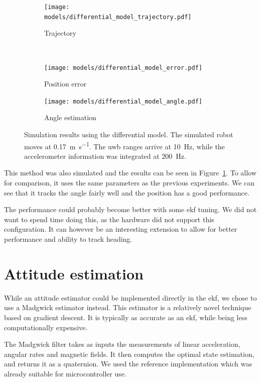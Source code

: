 \documentclass[a4paper, 12pt]{scrreprt}
\begin{document}
\begin{figure}[h!]
    \centering
    \begin{subfigure}[t]{0.4\textwidth}
        \texttt{[image: models/differential\_model\_trajectory.pdf]}
        \caption{Trajectory}
    \end{subfigure}%
    ~
    \begin{subfigure}[t]{0.4\textwidth}
        \texttt{[image: models/differential\_model\_error.pdf]}
        \caption{Position error}
    \end{subfigure}

    \begin{subfigure}[t]{0.4\textwidth}
        \texttt{[image: models/differential\_model\_angle.pdf]}
        \caption{Angle estimation}
    \end{subfigure}

    \caption{Simulation results using the differential model.
        The simulated robot moves at \SI{0.17}{\meter\per\second}.
        The \gls{uwb} ranges arrive at \SI{10}{\hertz}, while the accelerometer information was integrated at \SI{200}{\hertz}.
        \label{fig:differential_model}
    }
\end{figure}

This method was also simulated and the results can be seen in Figure~\ref{fig:differential_model}.
To allow for comparison, it uses the same parameters as the previous experiments.
We can see that it tracks the angle fairly well and the position has a good performance.

The performance could probably become better with some \gls{ekf} tuning.
We did not want to spend time doing this, as the hardware did not support this configuration.
It can however be an interesting extension to allow for better performance and ability to track heading.

\section{Attitude estimation}

While an attitude estimator could be implemented directly in the \gls{ekf}, we chose to use a Madgwick estimator instead.
This estimator is a relatively novel technique based on gradient descent.
It is typically as accurate as an \gls{ekf}, while being less computationally expensive\cite{madgwick2011estimation}.

The Madgwick filter takes as inputs the measurements of linear acceleration, angular rates and magnetic fields.
It then computes the optimal state estimation, and returns it as a quaternion.
We used the reference implementation\cite{madgwick2011estimation} which was already suitable for microcontroller use.
\end{document}
